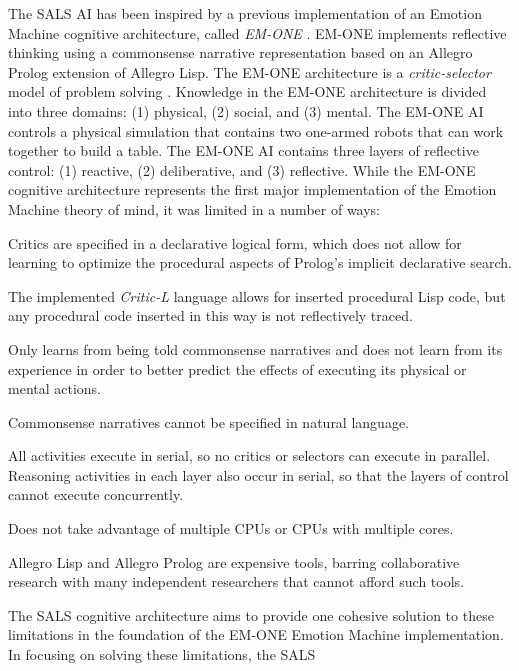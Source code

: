 The SALS AI has been inspired by a previous implementation of an
Emotion Machine cognitive architecture, called {\emph{EM-ONE}}
\cite[]{singh:2005b}.  EM-ONE implements reflective thinking using a
commonsense narrative representation based on an Allegro Prolog
extension of Allegro Lisp.  The EM-ONE architecture is a
{\emph{critic-selector}} model of problem solving
\cite[]{sussman:1973,singh:2002a,singh:2004,singh:2005a,singh:2005b,minsky:2006,morgan:2009}.
Knowledge in the EM-ONE architecture is divided into three domains:
(1) physical, (2) social, and (3) mental.  The EM-ONE AI controls a
physical simulation that contains two one-armed robots that can work
together to build a table.  The EM-ONE AI contains three layers of
reflective control: (1) reactive, (2) deliberative, and (3)
reflective.  While the EM-ONE cognitive architecture represents the
first major implementation of the Emotion Machine theory of mind, it
was limited in a number of ways:
\begin{packed_enumerate}
\item{Critics are specified in a declarative logical form, which does
  not allow for learning to optimize the procedural aspects of
  Prolog's implicit declarative search.}
\item{The implemented {\emph{Critic-L}} language allows for inserted
  procedural Lisp code, but any procedural code inserted in this way
  is not reflectively traced.}
\item{Only learns from being told commonsense narratives and does not
  learn from its experience in order to better predict the effects of
  executing its physical or mental actions.}
\item{Commonsense narratives cannot be specified in natural language.}
\item{All activities execute in serial, so no critics or selectors can
  execute in parallel.  Reasoning activities in each layer also occur
  in serial, so that the layers of control cannot execute
  concurrently.}
\item{Does not take advantage of multiple CPUs or CPUs with multiple
  cores.}
\item{Allegro Lisp and Allegro Prolog are expensive tools, barring
  collaborative research with many independent researchers that cannot
  afford such tools.}
\end{packed_enumerate}
The SALS cognitive architecture aims to provide one cohesive solution
to these limitations in the foundation of the EM-ONE Emotion Machine
implementation.  In focusing on solving these limitations, the SALS
